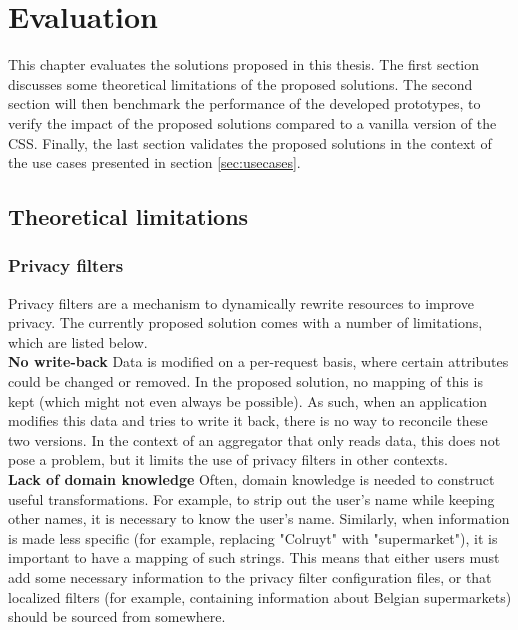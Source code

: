\chapter{Evaluation}
\label{cha:evaluation}
This chapter evaluates the solutions proposed in this thesis. The first section discusses some theoretical limitations of the proposed solutions. The second section will then benchmark the performance of the developed prototypes, to verify the impact of the proposed solutions compared to a vanilla version of the \acrlong{CSS}. Finally, the last section validates the proposed solutions in the context of the use cases presented in section \ref{sec:usecases}.

\section{Theoretical limitations}
\label{sec:limitations}
\subsection{Privacy filters}
Privacy filters are a mechanism to dynamically rewrite resources to improve privacy. The currently proposed solution comes with a number of limitations, which are listed below.\\

\noindent \textbf{No write-back} Data is modified on a per-request basis, where certain attributes could be changed or removed. In the proposed solution, no mapping of this is kept (which might not even always be possible). As such, when an application modifies this data and tries to write it back, there is no way to reconcile these two versions. In the context of an aggregator that only reads data, this does not pose a problem, but it limits the use of privacy filters in other contexts.\\

\noindent \textbf{Lack of domain knowledge} Often, domain knowledge is needed to construct useful transformations. For example, to strip out the user's name while keeping other names, it is necessary to know the user's name. Similarly, when information is made less specific (for example, replacing "Colruyt" with "supermarket"), it is important to have a mapping of such strings. This means that either users must add some necessary information to the privacy filter configuration files, or that localized filters (for example, containing information about Belgian supermarkets) should be sourced from somewhere.\\

